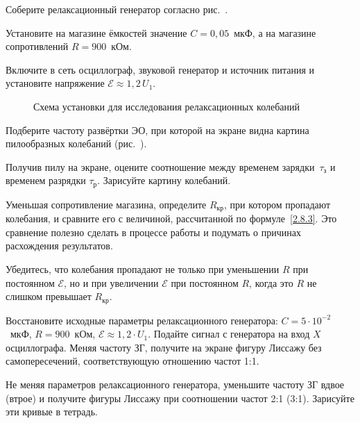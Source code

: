\begin{lab:task}

		\item Соберите релаксационный генератор согласно
         рис.~.

		\item Установите на магазине ёмкостей значение $C=0,05$~мкФ, а на
магазине сопротивлений $R=900$~кОм.

		\item Включите в сеть осциллограф, звуковой генератор и источник питания
и установите напряжение $\mathcal{E}\approx 1,2\,U_1$.

\begin{figure}[h!]
    \centering
	\caption{Схема установки для исследования релаксационных колебаний}
\end{figure}

		\item Подберите частоту развёртки ЭО, при которой на экране видна
картина пилообразных колебаний (рис.~).

		\item Получив пилу на экране, оцените соотношение между временем
зарядки~$\tau_{\text{з}}$ и временем разрядки $\tau_{\text{р}}$.
Зарисуйте картину колебаний.

		\item Уменьшая сопротивление магазина, определите $R_{\text{кр}}$, при
котором пропадают колебания, и сравните его с величиной,
рассчитанной по формуле~\eqref{2.8.3}. Это сравнение полезно сделать в процессе
работы и подумать о причинах расхождения
результатов.

Убедитесь, что колебания пропадают не только при уменьшении $R$ при постоянном
$\mathcal{E}$, но и при увеличении $\mathcal{E}$ при
постоянном $R$, когда это $R$ не слишком превышает $R_{\text{кр}}$.


		\item Восстановите исходные параметры релаксационного
генератора: $C=5\cdot 10^{-2}$~мкФ, $R=900$~кОм, $\mathcal{E}\approx 1,2 \cdot
U_1$. Подайте сигнал с генератора на вход $X$ осциллографа. Меняя частоту ЗГ,
получите на экране фигуру Лиссажу без
самопересечений, соответствующую отношению частот 1:1.

		\item Не меняя параметров релаксационного генератора, уменьшите частоту
ЗГ вдвое (втрое) и получите фигуры Лиссажу при
соотношении частот 2:1 (3:1). Зарисуйте эти кривые в тетрадь.


\end{lab:task}
